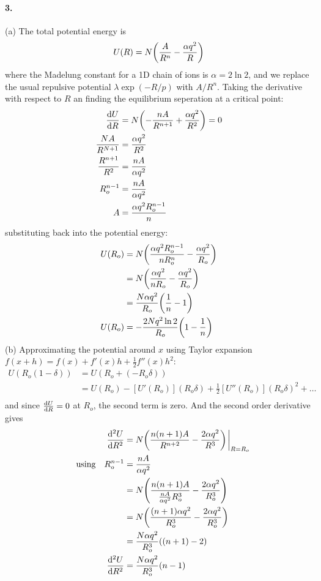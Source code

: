 \documentclass[../main.tex]{subfiles}
\begin{document}
\paragraph*{3.} (a) The total potential energy is 
\begin{align*}
    U(R) &= N \qt(\frac{A}{R^n} - \frac{\alpha q^2}{R}) \\
\end{align*}
where the Madelung constant for a 1D chain of ions is $\alpha = 2 \ln{2}$, and we replace the 
usual repulsive potential $\lambda \exp(-R/p)$ with $A/R^n$. Taking the derivative with respect to
$R$ an finding the equilibrium seperation at a critical point:
\begin{align*}
    \dv{U}{R} &= N \qt(-\frac{nA}{R^{n+1}} + \frac{\alpha q^2}{R^2}) = 0 \\ 
    \frac{NA}{R^{N+1}} &= \frac{\alpha q^2}{R^2} \\
    \frac{R^{n+1}}{R^2} &= \frac{nA}{\alpha q^2} \\
    R_o^{n-1} &= \frac{nA}{\alpha q^2} \\
    A &= \frac{\alpha q^2 R_o^{n-1}}{n}
\end{align*}
substituting back into the potential energy:
\begin{align*}
    U(R_o) &= N \qt(\frac{\alpha q^2 R_o^{n-1}}{nR_o^n} - \frac{\alpha q^2}{R_o}) \\
    &= N \qt(\frac{\alpha q^2}{nR_o} - \frac{\alpha q^2}{R_o}) \\
    &= \frac{N\alpha q^2}{R_o} \qt(\frac{1}{n} - 1) \\
    U(R_o) &= -\frac{2N q^2\ln{2}}{R_o} \qt(1 - \frac{1}{n})
\end{align*}
(b) Approximating the potential around $x$ using Taylor expansion
$f(x + h) = f(x) + f'(x) h + \frac{1}{2} f''(x) h^2$:
\newcommand{\rapr}{(R_o\delta)}
\begin{align*}
    U(R_o(1 - \delta)) &= U(R_o + (- R_o\delta))  \\
    &= U(R_o) - [U'(R_o)] \rapr + \frac{1}{2}[U''(R_o)] \rapr^2 + \dots \\
\end{align*}
and since $\dv{U}{R} = 0$ at $R_o$, the second term is zero. And the second order derivative gives
\begin{align*}
    \dv[2]{U}{R} &= N \qt(\frac{n(n+1)A}{R^{n+2}} - \frac{2\alpha q^2}{R^3})\eval_{R=R_o} \\
    \qusing R_o^{n-1} &= \frac{nA}{\alpha q^2} \\
    &= N \qt(\frac{n(n+1)A}{\frac{nA}{\alpha q^2} R_o^3} - \frac{2\alpha q^2}{R_o^3}) \\
    &= N \qt(\frac{(n+1)\alpha q^2}{R_o^3} - \frac{2\alpha q^2}{R_o^3}) \\
    &= \frac{N\alpha q^2}{R_o^3} ((n+1) - 2) \\
    \dv[2]{U}{R} &= \frac{N\alpha q^2}{R_o^3} (n - 1)
\end{align*}
\end{document}
